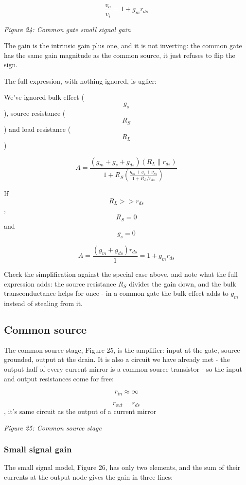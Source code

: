 \[ \frac{v_o}{v_i} = 1 + g_m r_{ds} \]


{
\centering
{}
}

\emph{Figure 24: Common gate small signal gain}

The gain is the intrinsic gain plus one, and it is not inverting: the
common gate has the same gain magnitude as the common source, it just
refuses to flip the sign.

The full expression, with nothing ignored, is uglier:

We've ignored bulk effect (\[g_s\]), source resistance (\[R_S\]) and
load resistance (\[R_L\])

\[ A = \frac{(g_{m} + g_s + g_{ds})(R_L \parallel r_{ds})}{1 + R_S\left(\frac{g_m + g_s +
g_{ds}}{1 + R_L/r_{ds}}\right)}\]

If \[R_L >> r_{ds} \], \[R_S  = 0\] and \[g_s = 0\]

\[ A = \frac{(g_{m} + g_{ds})r_{ds}}{1} = 1+ g_m r_{ds} \]

Check the simplification against the special case above, and note what
the full expression adds: the source resistance \(R_S\) divides the gain
down, and the bulk transconductance helps for once - in a common gate
the bulk effect adds to \(g_m\) instead of stealing from it.

\subsection{Common source}\label{common-source}

The common source stage, Figure 25, is the amplifier: input at the gate,
source grounded, output at the drain. It is also a circuit we have
already met - the output half of every current mirror is a common source
transistor - so the input and output resistances come for free:

\[r_{in} \approx \infty\]

\[r_{out}  = r_{ds}\], it's same circuit as the output of a current
mirror


{
\centering
{}
}

\emph{Figure 25: Common source stage}

\subsubsection{Small signal gain}\label{small-signal-gain-2}

The small signal model, Figure 26, has only two elements, and the sum of
their currents at the output node gives the gain in three lines:

